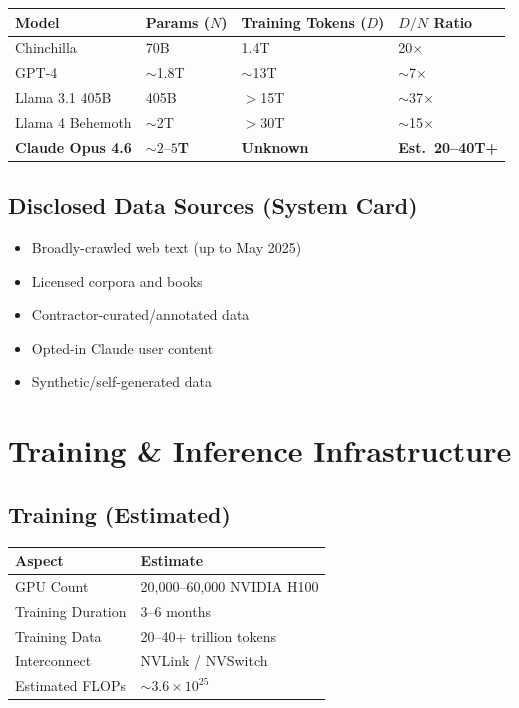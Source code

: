 \documentclass[11pt,a4paper]{article}
\begin{document}
\begin{center}
\begin{tabular}{llll}
\toprule
\textbf{Model} & \textbf{Params ($N$)} & \textbf{Training Tokens ($D$)} & \textbf{$D/N$ Ratio} \\
\midrule
Chinchilla & 70B & 1.4T & 20$\times$ \\
GPT-4 & $\sim$1.8T & $\sim$13T & $\sim$7$\times$ \\
Llama 3.1 405B & 405B & $>$15T & $\sim$37$\times$ \\
Llama 4 Behemoth & $\sim$2T & $>$30T & $\sim$15$\times$ \\
\textbf{Claude Opus 4.6} & $\sim 2\text{--}5$\textbf{T} & \textbf{Unknown} & \textbf{Est.\ 20--40T+} \\
\bottomrule
\end{tabular}
\end{center}

\subsection{Disclosed Data Sources (System Card)}

\begin{itemize}
  \item Broadly-crawled web text (up to May 2025)
  \item Licensed corpora and books
  \item Contractor-curated/annotated data
  \item Opted-in Claude user content
  \item Synthetic/self-generated data
\end{itemize}

\section{Training \& Inference Infrastructure}

\subsection{Training (Estimated)}

\begin{center}
\begin{tabular}{ll}
\toprule
\textbf{Aspect} & \textbf{Estimate} \\
\midrule
GPU Count & 20,000--60,000 NVIDIA H100 \\
Training Duration & 3--6 months \\
Training Data & 20--40+ trillion tokens \\
Interconnect & NVLink / NVSwitch \\
Estimated FLOPs & $\sim 3.6 \times 10^{25}$ \\
\bottomrule
\end{tabular}
\end{center}
\end{document}
